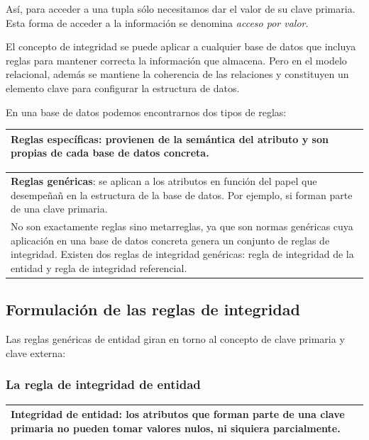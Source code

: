 \documentclass[10pt,a4paper,spanish]{report}
\begin{document}
Así, para acceder a una tupla sólo necesitamos dar el valor de su clave primaria. Esta forma de acceder a la información se denomina \textit{\textcolor[rgb]{1,0.2,0.3}{acceso por valor}}.

El concepto de integridad se puede aplicar a cualquier base de datos que incluya reglas para mantener correcta la información que almacena. Pero en el modelo relacional, además se mantiene la coherencia de las relaciones y constituyen un elemento clave para configurar la estructura de datos.

En una base de datos podemos encontrarnos dos tipos de reglas:

\begin{center}
\begin{tabular}{|p{12cm}|}
\hline
\textcolor[rgb]{1,0.2,0.3}{\textbf{Reglas específicas}}: provienen de la semántica del atributo y son propias de cada base de datos concreta. \\
\hline
\end{tabular} 

\begin{tabular}{|p{12cm}|}
\hline
\textcolor[rgb]{1,0.2,0.3}{\textbf{Reglas genéricas}}: se aplican a los atributos en función del papel que desempeñañ en la estructura de la base de datos. Por ejemplo, si forman parte de una clave primaria. \\

No son exactamente reglas sino metarreglas, ya que son normas genéricas cuya aplicación en una base de datos concreta genera un conjunto de reglas de integridad. Existen dos reglas de integridad genéricas: regla de integridad de la entidad y regla de integridad referencial.\\
\hline
\end{tabular}
\end{center}

\textcolor[rgb]{1,0.2,0.3}{\subsection{Formulación de las reglas de integridad}}

Las reglas genéricas de entidad giran en torno al concepto de clave primaria y clave externa:

\textcolor[rgb]{1,0.2,0.3}{\subsubsection{La regla de integridad de entidad}}
\begin{center}
\begin{tabular}{|p{12cm}|}
\hline
\textcolor[rgb]{1,0.2,0.3}{\textbf{Integridad de entidad}}: los atributos que forman parte de una clave primaria no pueden tomar valores nulos, ni siquiera parcialmente. \\
\hline
\end{tabular} 
\end{center}
\end{document}
